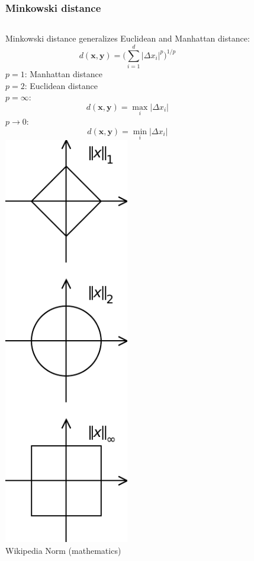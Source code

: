 \documentclass[Nike]{tuberlinbeamer}
\newcommand{\x}{\boldsymbol{x}}
\newcommand{\y}{\boldsymbol{y}}
\begin{document}
\begin{frame}[t]
  \frametitle{Minkowski distance}
  \begin{columns}[T]
      Minkowski distance generalizes Euclidean and Manhattan distance:
      \begin{equation*}
        d(\x, \y) = \Bigg(\sum_{i=1}^d |\Delta x_i|^p\Bigg)^{1/p}
      \end{equation*}
      \pause
      $p=1$: Manhattan distance\\
      $p=2$: Euclidean distance\\
      \pause
      $p=\infty$:
      \begin{equation*}
        d(\x, \y) = \max_{i} |\Delta x_i|
      \end{equation*}
      \pause
      $p\rightarrow0$:
      \begin{equation*}
        d(\x, \y) = \min_{i} |\Delta x_i|
      \end{equation*}
      \pause
      \includegraphics[width=0.5\textwidth]{minkowski_norms.pdf}\\
      \tiny Wikipedia Norm (mathematics)
  \end{columns}
\end{frame}
\end{document}
